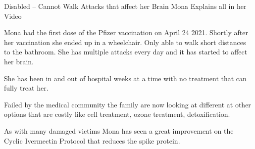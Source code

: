 Disabled – Cannot Walk Attacks that affect her Brain Mona Explains all in her
Video

Mona had the first dose of the Pfizer vaccination on April 24 2021. Shortly
after her vaccination she ended up in a wheelchair. Only able to walk short
distances to the bathroom. She has multiple attacks every day and it has started
to affect her brain.

She has been in and out of hospital weeks at a time with no treatment that can
fully treat her.

Failed by the medical community the family are now looking at different at other
options that are costly like cell treatment, ozone treatment, detoxification.

As with many damaged victims Mona has seen a great improvement on the Cyclic
Ivermectin Protocol that reduces the spike protein.

